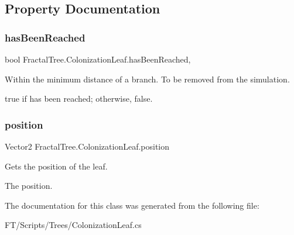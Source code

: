 \subsection{Property Documentation}
\mbox{\label{class_fractal_tree_1_1_colonization_leaf_ad45a7ad00f87add9c92cd78047e892aa}} 
\subsubsection{\texorpdfstring{has\+Been\+Reached}{hasBeenReached}}
{\footnotesize\ttfamily bool Fractal\+Tree.\+Colonization\+Leaf.\+has\+Been\+Reached\hspace{0.3cm}{\ttfamily [get]}, {\ttfamily [set]}}



Within the minimum distance of a branch. To be removed from the simulation. 

{\ttfamily true} if has been reached; otherwise, {\ttfamily false}.\mbox{\label{class_fractal_tree_1_1_colonization_leaf_a3e33ba00c3c7536f51f7f0c71487a091}} 
\subsubsection{\texorpdfstring{position}{position}}
{\footnotesize\ttfamily Vector2 Fractal\+Tree.\+Colonization\+Leaf.\+position\hspace{0.3cm}{\ttfamily [get]}}



Gets the position of the leaf. 

The position.

The documentation for this class was generated from the following file\+:\begin{DoxyCompactItemize}
\item 
F\+T/\+Scripts/\+Trees/Colonization\+Leaf.\+cs\end{DoxyCompactItemize}
